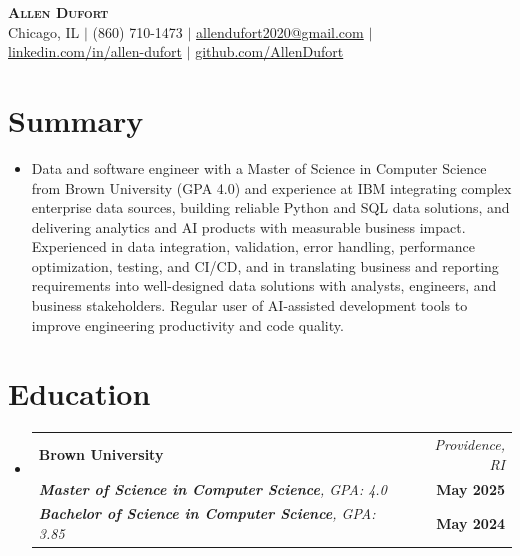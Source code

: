 \documentclass[letterpaper,10pt]{article}
\makeatletter
\newcommand{\resumeEdHeading}[6]{
  \item
  \begin{tabular*}{\textwidth}{l@{\extracolsep{\fill}}r}
    \textbf{#1} & \textit{\small #2} \\
    \textit{#3} & \textbf{\small #4} \\
    \textit{#5} & \textbf{\small #6} \\
  \end{tabular*}\vspace{-7pt}
}
\newcommand{\resumeSubHeadingListStart}{\begin{itemize}[leftmargin=0in, label={}]}
\newcommand{\resumeSubHeadingListEnd}{\end{itemize}}
\newcommand{\resumeItemListStart}{\begin{itemize}}
\newcommand{\resumeItemListEnd}{\end{itemize}\vspace{-5pt}}
\makeatother
\begin{document}
\begin{center}
  \textbf{\Huge \scshape Allen Dufort} \\ \vspace{6pt}
  \small
  Chicago, IL $|$
  (860) 710-1473 $|$
  \href{mailto:allendufort2020@gmail.com}{allendufort2020@gmail.com} $|$
  \href{https://www.linkedin.com/in/allen-dufort/}{linkedin.com/in/allen-dufort} $|$
  \href{https://github.com/AllenDufort}{github.com/AllenDufort}
\end{center}

\section{Summary}
\resumeItemListStart[leftmargin=0in, label={}]
  \item\small{
    Data and software engineer with a Master of Science in Computer Science from Brown University (GPA 4.0) and experience at IBM integrating complex enterprise data sources, building reliable Python and SQL data solutions, and delivering analytics and AI products with measurable business impact. Experienced in data integration, validation, error handling, performance optimization, testing, and CI/CD, and in translating business and reporting requirements into well-designed data solutions with analysts, engineers, and business stakeholders. Regular user of AI-assisted development tools to improve engineering productivity and code quality.
  }
\resumeItemListEnd

\section{Education}
\resumeSubHeadingListStart
  \resumeEdHeading
    {Brown University}{Providence, RI}
    {\textbf{Master of Science in Computer Science}, GPA: 4.0}{May 2025}
    {\textbf{Bachelor of Science in Computer Science}, GPA: 3.85}{May 2024}
\resumeSubHeadingListEnd

\end{document}
